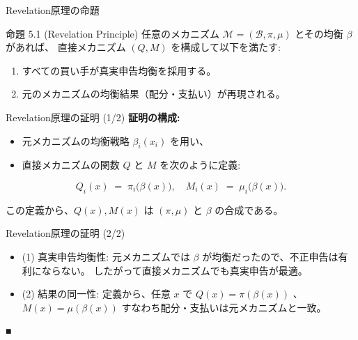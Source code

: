 \documentclass[dvipdfmx,autodetect-engine]{beamer}
\begin{document}
\begin{frame}{Revelation原理の命題}
  \begin{block}{命題 5.1 (Revelation Principle)}
    任意のメカニズム $\mathcal{M}=(\mathcal{B},\pi,\mu)$ とその均衡 $\beta$ があれば、
    直接メカニズム $(Q,M)$ を構成して以下を満たす:
    \begin{enumerate}
      \item すべての買い手が真実申告均衡を採用する。
      \item 元のメカニズムの均衡結果（配分・支払い）が再現される。
    \end{enumerate}
  \end{block}
\end{frame}

\begin{frame}{Revelation原理の証明 (1/2)}
  \textbf{証明の構成:}
  \begin{itemize}
    \item 元メカニズムの均衡戦略 $\beta_i(x_i)$ を用い、
    \item 直接メカニズムの関数 $Q$ と $M$ を次のように定義:
  \end{itemize}

  \begin{center}
    \[
      Q_i(x) \;=\; \pi_i\bigl(\beta(x)\bigr),
      \quad
      M_i(x) \;=\; \mu_i\bigl(\beta(x)\bigr).
    \]
  \end{center}

  この定義から、$Q(x),M(x)$ は $(\pi,\mu)$ と $\beta$ の合成である。
\end{frame}


\begin{frame}{Revelation原理の証明 (2/2)}
  \begin{itemize}
    \item (1) 真実申告均衡性:
      元メカニズムでは $\beta$ が均衡だったので、不正申告は有利にならない。
      したがって直接メカニズムでも真実申告が最適。
    \item (2) 結果の同一性:
      定義から、任意 $x$ で $Q(x)=\pi(\beta(x))$ 、$M(x)=\mu(\beta(x))$ \newline
      すなわち配分・支払いは元メカニズムと一致。
  \end{itemize}
  \begin{flushright}
    ■
  \end{flushright}
\end{frame}
\end{document}

